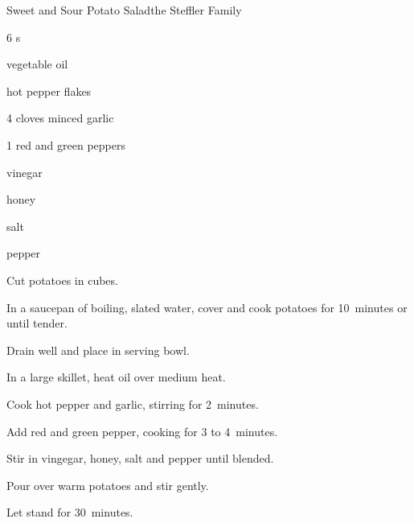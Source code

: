 \begin{recipe}{Sweet and Sour Potato Salad}{the Steffler Family}{}

\begin{ingredients}
\item 6 s
\item {} vegetable oil
\item hot pepper flakes
\item 4 cloves minced garlic
\item 1 red and green peppers
\item \C{\third} vinegar
\item {} honey
\item \tp{\half} salt
\item \tp{\half} pepper
\end{ingredients}

\begin{directions}
\item Cut potatoes in  cubes.
\item In a saucepan of boiling, slated water, cover and cook potatoes for 10~minutes or until tender.
\item Drain well and place in serving bowl.
\item In a large skillet, heat oil over medium heat.
\item Cook hot pepper and garlic, stirring for 2~minutes.
\item Add red and green pepper, cooking for 3 to 4~minutes.
\item Stir in vingegar, honey, salt and pepper until blended.
\item Pour over warm potatoes and stir gently.
\item Let stand for 30~minutes.
\end{directions}
\end{recipe}
